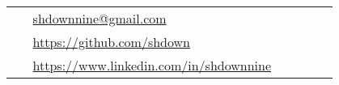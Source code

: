 \documentclass[10pt]{article}
\begin{document}
\parbox[top][0.12\textheight][c]{\linewidth}{
    \vspace{-0.04\textheight}
    \colorbox{shade}{
        \begin{supertabular}{p{0.05\linewidth}|p{0.775\linewidth}}
            \raisebox{0pt}{\small  \faEnvelope}        & \href{mailto:shdownnine@gmail.com}{shdownnine@gmail.com} \\
            \raisebox{-1pt}{\small \faGithubAlt}       & \href{https://github.com/shdown}{https://github.com/shdown} \\
            \raisebox{-1pt}{\small \faLinkedinSquare}  & \href{https://www.linkedin.com/in/shdownnine}{https://www.linkedin.com/in/shdownnine} \\
        \end{supertabular}
    }
}
\end{document}
